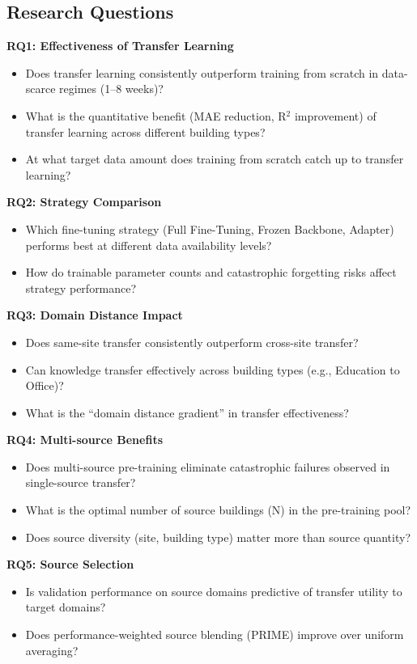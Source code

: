 \documentclass[12pt,a4paper]{report}
\begin{document}
\subsection{Research Questions}

\textbf{RQ1: Effectiveness of Transfer Learning}
\begin{itemize}
    \item Does transfer learning consistently outperform training from scratch in data-scarce regimes (1--8 weeks)?
    \item What is the quantitative benefit (MAE reduction, R$^2$ improvement) of transfer learning across different building types?
    \item At what target data amount does training from scratch catch up to transfer learning?
\end{itemize}

\textbf{RQ2: Strategy Comparison}
\begin{itemize}
    \item Which fine-tuning strategy (Full Fine-Tuning, Frozen Backbone, Adapter) performs best at different data availability levels?
    \item How do trainable parameter counts and catastrophic forgetting risks affect strategy performance?
\end{itemize}

\textbf{RQ3: Domain Distance Impact}
\begin{itemize}
    \item Does same-site transfer consistently outperform cross-site transfer?
    \item Can knowledge transfer effectively across building types (e.g., Education to Office)?
    \item What is the ``domain distance gradient'' in transfer effectiveness?
\end{itemize}

\textbf{RQ4: Multi-source Benefits}
\begin{itemize}
    \item Does multi-source pre-training eliminate catastrophic failures observed in single-source transfer?
    \item What is the optimal number of source buildings (N) in the pre-training pool?
    \item Does source diversity (site, building type) matter more than source quantity?
\end{itemize}

\textbf{RQ5: Source Selection}
\begin{itemize}
    \item Is validation performance on source domains predictive of transfer utility to target domains?
    \item Does performance-weighted source blending (PRIME) improve over uniform averaging?
\end{itemize}
\end{document}
